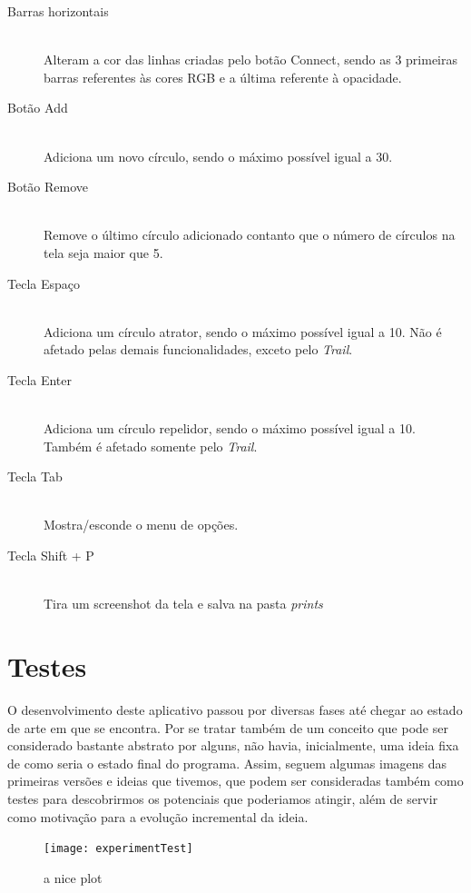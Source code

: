 \documentclass[12pt]{article}
\begin{document}
\begin{description}
\item[Barras horizontais] \hfill \\
Alteram a cor das linhas criadas pelo botão Connect, sendo as 3 primeiras barras referentes às cores RGB e a última referente à opacidade.
\vspace{0.4 true cm}

\item[Botão Add] \hfill \\
Adiciona um novo círculo, sendo o máximo possível igual a 30.
\vspace{0.4 true cm}

\item[Botão Remove] \hfill \\
Remove o último círculo adicionado contanto que o número de círculos na tela seja maior que 5.
\vspace{0.4 true cm}

\item[Tecla Espaço] \hfill \\
Adiciona um círculo atrator, sendo o máximo possível igual a 10. Não é afetado pelas demais funcionalidades, exceto pelo \textit{Trail}.
\vspace{0.4 true cm}

\item[Tecla Enter] \hfill \\
Adiciona um círculo repelidor, sendo o máximo possível igual a 10. Também é afetado somente pelo \textit{Trail}.
\vspace{0.4 true cm}

\item[Tecla Tab] \hfill \\
Mostra/esconde o menu de opções.
\vspace{0.4 true cm}

\item[Tecla Shift + P] \hfill \\
Tira um screenshot da tela e salva na pasta \textit{prints}

\end{description}

\section{Testes}
\label{testes}

O desenvolvimento deste aplicativo passou por diversas fases até chegar ao estado de arte em que se encontra. Por se tratar também de um conceito
que pode ser considerado bastante abstrato por alguns, não havia, inicialmente, uma ideia fixa de como seria o estado final do programa. Assim,
seguem algumas imagens das primeiras versões e ideias que tivemos, que podem ser consideradas também como testes para descobrirmos os potenciais
que poderiamos atingir, além de servir como motivação para a evolução incremental da ideia.
\begin{figure}[h]
  \texttt{[image: experimentTest]}
  \caption{a nice plot}
\end{figure}
\end{document}
